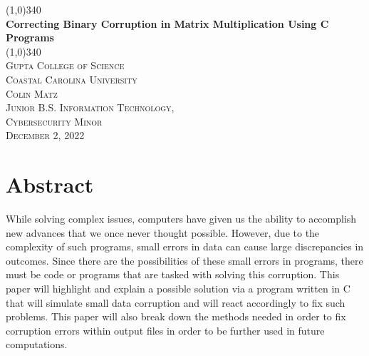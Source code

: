\documentclass{article}
\begin{document}
    \begin{titlepage}
        \begin{center}
            \line(1,0){340} \\
            [5mm]
            \huge{\bfseries Correcting Binary Corruption in Matrix Multiplication Using C Programs} \\
            \line(1,0){340} \\
            [.25 in]
            \textsc{\LARGE Gupta College of Science} \\
            \textsc{\LARGE Coastal Carolina University} \\
            [.25 in]
            \textsc{\LARGE Colin Matz \\
            Junior B.S. Information Technology, \\ 
            Cybersecurity Minor \\
            December 2, 2022} \\
        \end{center}
    \end{titlepage}

    \section*{Abstract}\label{sec:abstract}
    While solving complex issues, computers have given us the ability to accomplish new advances that 
    we once never thought possible. However, due to the complexity of such programs, small errors in data
    can cause large discrepancies in outcomes. Since there are the possibilities of these small errors in
    programs, there must be code or programs that are tasked with solving this corruption. This paper will
    highlight and explain a possible solution via a program written in C that will simulate small data
    corruption and will react accordingly to fix such problems. This paper will also break down the methods
    needed in order to fix corruption errors within output files in order to be further used in future 
    computations.


    \listoffigures

    \listoftables
    \newpage
\end{document}
